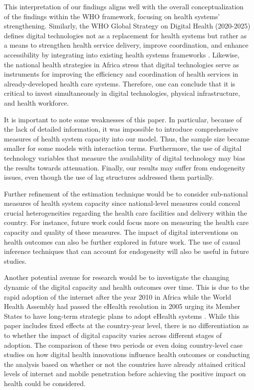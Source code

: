 \documentclass[12pt]{article}
\begin{document}
\medskip
This interpretation of our findings aligns well with the overall conceptualization of the findings within the WHO framework, focusing on health systems’ strengthening. Similarly, the WHO Global Strategy on Digital Health (2020-2025) defines digital technologies not as a replacement for health systems but rather as a means to strengthen health service delivery, improve coordination, and enhance accessibility by integrating into existing health systems frameworks \citep{who2021}.   Likewise, the national health strategies in Africa stress that digital technologies serve as instruments for improving the efficiency and coordination of health services in already-developed health care systems. Therefore, one can conclude that it is critical to invest simultaneously in digital technologies, physical infrastructure, and health workforce.

\medskip
It is important to note some weaknesses of this paper. In particular, because of the lack of detailed information, it was impossible to introduce comprehensive measures of health system capacity into our model. Thus, the sample size became smaller for some models with interaction terms. Furthermore, the use of digital technology variables that measure the availability of digital technology may bias the results towards attenuation. Finally, our results may suffer from endogeneity issues, even though the use of lag structures addressed them partially.

\medskip
Further refinement of the estimation technique would be to consider sub-national measures of health system capacity since national-level measures could conceal crucial heterogeneities regarding the health care facilities and delivery within the country. For instance, future work could focus more on measuring the health care capacity and quality of these measures. The impact of digital interventions on health outcomes can also be further explored in future work. The use of causal inference techniques that can account for endogeneity will also be useful in future studies.

\medskip
Another potential avenue for research would be to investigate the changing dynamic of the digital capacity and health outcomes over time. This is due to the rapid adoption of the internet after the year 2010 in Africa while the World Health Assembly had passed the eHealth resolution in 2005 urging its Member States to have long-term strategic plans to adopt eHealth systems \citep{WHA2005}. While this paper includes fixed effects at the country-year level, there is no differentiation as to whether the impact of digital capacity varies across different stages of adoption. The comparison of these two periods or even doing country-level case studies on how digital health innovations influence health outcomes or conducting the analysis based on whether or not the countries have already attained critical levels of internet and mobile penetration before achieving the positive impact on health could be considered.
\end{document}
